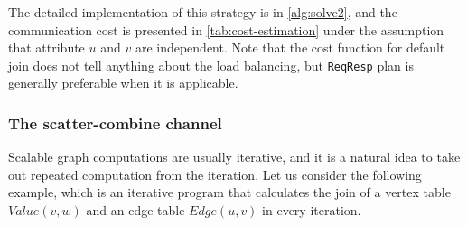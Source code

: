 \documentclass{sokendai_thesis} %
\begin{document}
The detailed implementation of this strategy is in \autoref{alg:solve2}, and the communication cost is presented in \autoref{tab:cost-estimation} under the assumption that attribute $u$ and $v$ are independent. %
Note that the cost function for default join does not tell anything about the load balancing, but \texttt{ReqResp} plan is generally preferable when it is applicable.

\subsubsection{The scatter-combine channel}

Scalable graph computations are usually iterative, and it is a natural idea to take out repeated computation from the iteration.
Let us consider the following example, which is an iterative program that calculates the join of a vertex table $Value(v, w)$ and an edge table $Edge(u, v)$ in every iteration.
\end{document}
